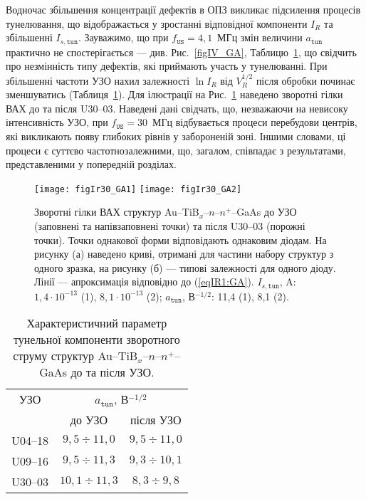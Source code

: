 \documentclass[a4paper,14pt,oneside,openany]{memoir}
\begin{document}
Водночас збільшення концентрації дефектів в ОПЗ викликає підсилення процесів тунелювання, що відображається у зростанні відповідної компоненти $I_R$
та збільшенні $I_{s,\mathtt{tun}}$.
Зауважимо, що при $f_\mathtt{US}=4,1$~МГц змін величини $a_\mathtt{tun}$ практично не спостерігається --- див. Рис.~\ref{figIV_GA}, Таблицю~\ref{tabUS_GaAs},
що свідчить про незмінність типу дефектів, які приймають участь у тунелюванні.
При збільшенні частоти УЗО нахил залежності $\ln I_R$ від $V_R^{1/2}$  після обробки починає зменшуватись (Таблиця~\ref{tabUS_GaAs}).
Для ілюстрації на Рис.~\ref{figIr30_GA} наведено зворотні гілки ВАХ до та після U30--03.
Наведені дані свідчать, що, незважаючи на невисоку інтенсивність УЗО, при $f_\mathtt{US}=30$~МГц відбувається процеси перебудови центрів, які викликають появу глибоких рівнів у забороненій зоні.
Іншими словами, ці процеси є суттєво частотнозалежними, що, загалом, співпадає з результатами, представленими у попередній розділах.


\begin{figure}
\center
\texttt{[image: figIr30\_GA1]} \hfill
\texttt{[image: figIr30\_GA2]}
\caption{\label{figIr30_GA}
Зворотні гілки ВАХ структур Au--TiB$_x$--$n$--$n^+$--GaAs
до УЗО (заповнені та напівзаповнені точки)
та після U30--03 (порожні точки).
Точки однакової форми відповідають однаковим діодам.
На рисунку (а) наведено криві, отримані для частини набору структур з одного зразка,
на рисунку (б) --- типові залежності для одного діоду.
Лінії --- апроксимація відповідно до (\ref{eqIR1:GA}).
$I_{s,\mathtt{tun}}$, A: $1,4\cdot10^{-13}$ (1), $8,1\cdot10^{-13}$ (2);
$a_\mathtt{tun}$, В$^{-1/2}$: 11,4 (1), 8,1 (2).
}%
\end{figure}

\begin{table}
\caption{\label{tabUS_GaAs}Характеристичний параметр тунельної компоненти
зворотного струму структур Au--TiB$_x$--$n$--$n^+$--GaAs до та після УЗО.
}
\center
\begin{tabular}{|c|c|c|}
\hline
УЗО&\multicolumn{2}{c|}{$a_\mathtt{tun}$, В$^{-1/2}$}\\ \cline{2-3}
& до УЗО & після УЗО \\
\hline
U04--18&$9,5\div11,0$&$9,5\div11,0$\\ \hline
U09--16&$9,5\div11,3$&$9,3\div10,1$\\ \hline
U30--03&$10,1\div11,3$&$8,3\div9,8$\\ \hline
\end{tabular}
\end{table}
\end{document}
